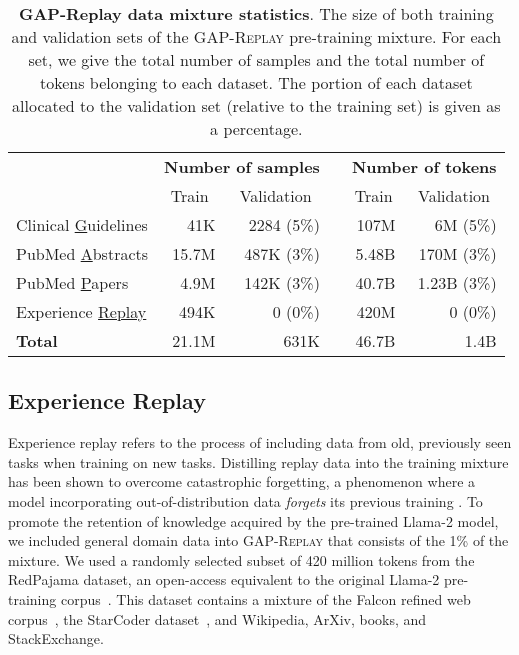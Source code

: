 \documentclass{article}
\newcommand{\llama}{\textnormal{Llama}}
\begin{document}
\begin{table}[t]
\centering
\small
\begin{tabular}{lrrlrr}
\toprule
\addlinespace[1ex] \multirow{2}{*}{\textbf{Dataset}} & \multicolumn{2}{c}{\textbf{Number of samples}} & & \multicolumn{2}{c}{\textbf{Number of tokens}} \\
\addlinespace[1ex] \cline{2-3} \cline{5-6}
\addlinespace[1ex] & \multicolumn{1}{c}{Train} & \multicolumn{1}{c}{Validation} & & \multicolumn{1}{c}{Train} & \multicolumn{1}{c}{Validation} \\
\midrule
Clinical \underline{G}uidelines & 41K & 2284 (5\%) & & 107M & 6M (5\%) \\
PubMed \underline{A}bstracts & 15.7M & 487K (3\%) & & 5.48B & 170M (3\%) \\
PubMed \underline{P}apers & 4.9M & 142K (3\%) & & 40.7B & 1.23B (3\%) \\
Experience \underline{Replay} & 494K & 0 (0\%) & & 420M & 0 (0\%) \\
\midrule 
\textbf{Total} & 21.1M & 631K & & 46.7B & 1.4B \\
\bottomrule
\end{tabular}
\caption{\textbf{GAP-Replay data mixture statistics}. The size of both training and validation sets of the \textsc{GAP-Replay} pre-training mixture. For each set, we give the total number of samples and the total number of tokens belonging to each dataset. The portion of each dataset allocated to the validation set (relative to the training set) is given as a percentage.}
\label{tab:gap-replay-sizes}
\vspace{-5mm}
\end{table}


\subsection{Experience Replay} \label{sec:2-data-replay}
Experience replay refers to the process of including data from old, previously seen tasks when training on new tasks.
Distilling replay data into the training mixture has been shown to overcome catastrophic forgetting, a phenomenon where a model incorporating out-of-distribution data \textit{forgets} its previous training \citep{Sun2020DistillAR}.
To promote the retention of knowledge acquired by the pre-trained  \llama-2 model, we included general domain data into \textsc{GAP-Replay} that consists of the 1\% of the mixture. 
We used a randomly selected subset of 420 million tokens from the RedPajama dataset, an open-access equivalent to the original  \llama-2 pre-training corpus~\citep{together2023redpajama}.
This dataset contains a mixture of the Falcon refined web corpus~\citep{penedo2023refinedweb}, the StarCoder dataset~\citep{starcoder}, and Wikipedia, ArXiv, books, and StackExchange.
\end{document}
